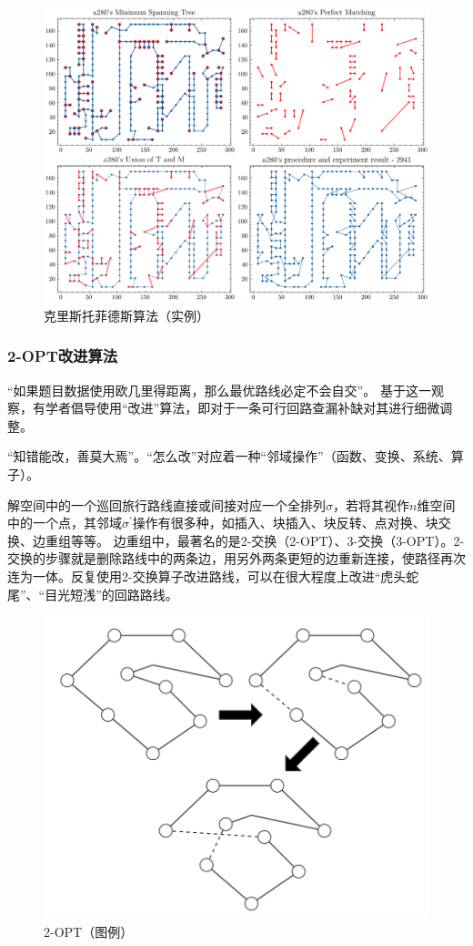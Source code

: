 \documentclass[12pt]{ctexart}
\begin{document}
\begin{figure}[htbp]
    \centering
    \includegraphics[width=0.7\linewidth]{../assets-v1/illustrations/christofides - a280's procedure and experiment result - 2941.png}
    \caption{克里斯托菲德斯算法（实例）}
\end{figure}

\subsubsection{2-OPT改进算法}

“如果题目数据使用欧几里得距离，那么最优路线必定不会自交”。
基于这一观察，有学者倡导使用“改进”算法，即对于一条可行回路查漏补缺对其进行细微调整。

“知错能改，善莫大焉”。“怎么改”对应着一种“邻域操作”（函数、变换、系统、算子）。

解空间中的一个巡回旅行路线直接或间接对应一个全排列$\sigma$，若将其视作$n$维空间中的一个点，其邻域$\sigma^\prime$操作有很多种，如插入、块插入、块反转、点对换、块交换、边重组等等。
边重组中，最著名的是2-交换（2-OPT）、3-交换（3-OPT）。2-交换的步骤就是删除路线中的两条边，用另外两条更短的边重新连接，使路径再次连为一体。反复使用2-交换算子改进路线，可以在很大程度上改进“虎头蛇尾”、“目光短浅”的回路路线。
\begin{figure}[htbp]
    \centering
    \includegraphics[width=0.35\linewidth]{../assets-v1/images/opt-2.png}
    \caption{2-OPT（图例）}
\end{figure}
\end{document}
